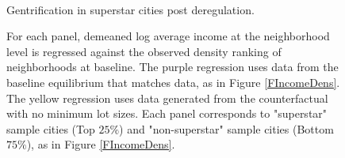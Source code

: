 \documentclass[12pt]{article}
\begin{document}
	
	\begin{figure}[htbp!]
		
		\caption{ \\ Gentrification in superstar cities post deregulation.}\label{figure:gentrification}
		
		\caption*{For each panel, demeaned log average income at the neighborhood level is regressed against the observed density ranking of neighborhoods at baseline. The purple regression uses data from the baseline equilibrium that matches data, as in Figure \ref{FIncomeDens}. The yellow regression uses data generated from the counterfactual with no minimum lot sizes. Each panel corresponds to "superstar" sample cities (Top $25 \%$) and "non-superstar" sample cities (Bottom $75 \%$), as in Figure \ref{FIncomeDens}. }
		
	\end{figure}
	
\end{document}
